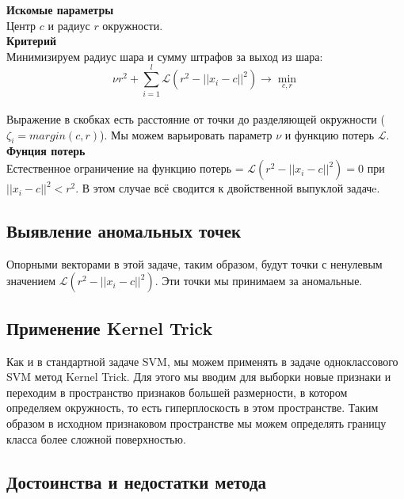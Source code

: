\textbf{Искомые параметры} \\

Центр $c$ и радиус $r$ окружности. \\

\textbf{Критерий} \\

Минимизируем радиус шара и сумму штрафов за выход из шара:\\

\[ \nu r^2 + \sum_{i = 1}^l \mathcal{L} (r^2 - ||x_i - c||^2) \longrightarrow \min_{c, r}\] \\

Выражение в скобках есть расстояние от точки до разделяющей окружности ($\zeta_i = margin(c,r)$). Мы можем варьировать параметр $\nu$ и функцию потерь $\mathcal{L}$. \\

\textbf{Фунция потерь} \\

Естественное ограничение на функцию потерь = $\mathcal{L} (r^2 - ||x_i - c||^2) = 0$ при $||x_i - c||^2 < r^2$. В этом случае всё сводится к двойственной выпуклой задачe.

\subsection{Выявление аномальных точек} 

Опорными векторами в этой задаче, таким образом, будут точки с ненулевым значением $\mathcal{L} (r^2 - ||x_i - c||^2)$. Эти точки мы принимаем за аномальные. \\

\subsection{Применение Kernel Trick} 

Как и в стандартной задаче SVM, мы можем применять в задаче одноклассового SVM метод Kernel Trick. Для этого мы вводим для выборки новые признаки и переходим в пространство признаков большей размерности, в котором определяем окружность, то есть гиперплоскость в этом пространстве. Таким образом в исходном признаковом пространстве мы можем определять границу класса более сложной поверхностью.

\subsection{Достоинства и недостатки метода} 

